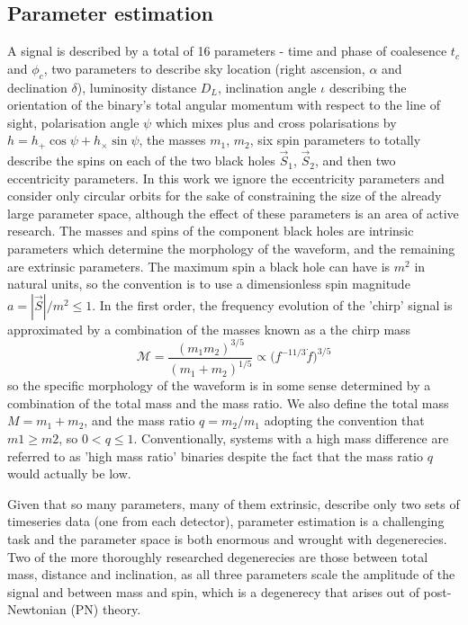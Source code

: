 \documentclass[11pt]{article}
\begin{document}
\subsection{Parameter estimation}
A signal is described by a total of 16 parameters\cite{props} - time and phase of coalesence $t_c$ and $\phi_c$, two parameters to describe sky location (right ascension, $\alpha$ and declination $\delta$), luminosity distance $D_L$, inclination angle $\iota$ describing the orientation of the binary's total angular momentum with respect to the line of sight, polarisation angle $\psi$ which mixes plus and cross polarisations by $h=h_+\cos\psi+h_\times\sin\psi$, the masses $m_1$, $m_2$, six spin parameters to totally describe the spins on each of the two black holes $\vec{S}_1$, $\vec{S}_2$, and then two eccentricity parameters. In this work we ignore the eccentricity parameters and consider only circular orbits for the sake of constraining the size of the already large parameter space, although the effect of these parameters is an area of active research. The masses and spins of the component black holes are intrinsic parameters which determine the morphology of the waveform, and the remaining are extrinsic parameters. The maximum spin a black hole can have is $m^2$ in natural units, so the convention is to use a dimensionless spin magnitude $a=|\vec{S}|/m^2 \leq 1$. In the first order, the frequency evolution of the 'chirp' signal is approximated by a combination of the masses known as a the chirp mass
\begin{equation}
\mathcal{M}=\frac{(m_1m_2)^{3/5}}{(m_1+m_2)^{1/5}}\propto \bigg(f^{-11/3}\dot{f}\bigg)^{3/5}
\end{equation}
so the specific morphology of the waveform is in some sense determined by a combination of the total mass and the mass ratio. We also define the total mass $M=m_1+m_2$, and the mass ratio $q=m_2/m_1$ adopting the convention that $m1\geq m2$, so $0<q\leq1$. Conventionally, systems with a high mass difference are referred to as 'high mass ratio' binaries despite the fact that the mass ratio $q$ would actually be low.

Given that so many parameters, many of them extrinsic, describe only two sets of timeseries data (one from each detector), parameter estimation is a challenging task and the parameter space is both enormous and wrought with degenerecies. Two of the more thoroughly researched degenerecies are those between total mass, distance and inclination, as all three parameters scale the amplitude of the signal and between mass and spin\cite{spindegen}, which is a degenerecy that arises out of post-Newtonian (PN) theory. 
\end{document}
